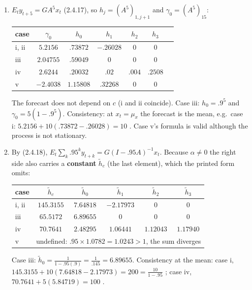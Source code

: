 \documentclass[12pt, letterpaper]{article}
\begin{document}
\begin{tcolorbox}[evenbox,title={Exercise 2.4 \quad AR(4) with a Constant}]
\begin{enumerate}
\item $E_ty_{t+5}=GA^5x_t$ (2.4.17), so $h_j=(A^5)_{1,j+1}$ and $\gamma_0=(A^5)_{15}$:
\begin{center}\small
\begin{tabular}{@{}lcccccc@{}}
\toprule
case & $\gamma_0$ & $h_0$ & $h_1$ & $h_2$ & $h_3$\\
\midrule
i, ii & $5.2156$ & $.73872$ & $-.26028$ & 0 & 0\\
iii & $2.04755$ & $.59049$ & 0 & 0 & 0\\
iv & $2.6244$ & $.20032$ & $.02$ & $.004$ & $.2508$\\
v & $-2.4038$ & $1.15808$ & $.32268$ & 0 & 0\\
\bottomrule
\end{tabular}
\end{center}
The forecast does not depend on $c$ (i and ii coincide). Case iii: $h_0=.9^5$ and
$\gamma_0=5(1-.9^5)$. Consistency: at $x_t=\mu_x$ the forecast is the mean, e.g.\ case i:
$5.2156+10(.73872-.26028)=10$ \checkmark. Case v's formula is valid although the process is not
stationary.

\item By (2.4.18), $E_t\sum_k.95^ky_{t+k}=G(I-.95A)^{-1}x_t$. Because $\alpha\neq0$ the right side
also carries a \textbf{constant} $\tilde h_c$ (the last element), which the printed form omits:
\begin{center}\small
\begin{tabular}{@{}lccccc@{}}
\toprule
case & $\tilde h_c$ & $\tilde h_0$ & $\tilde h_1$ & $\tilde h_2$ & $\tilde h_3$\\
\midrule
i, ii & $145.3155$ & $7.64818$ & $-2.17973$ & 0 & 0\\
iii & $65.5172$ & $6.89655$ & 0 & 0 & 0\\
iv & $70.7641$ & $2.48295$ & $1.06441$ & $1.12043$ & $1.17940$\\
v & \multicolumn{5}{c}{undefined: $.95\times1.0782=1.0243>1$, the sum diverges}\\
\bottomrule
\end{tabular}
\end{center}
Case iii: $\tilde h_0=\frac{1}{1-.95(.9)}=\frac1{.145}=6.89655$. Consistency at the mean: case i,
$145.3155+10(7.64818-2.17973)=200=\frac{10}{1-.95}$ \checkmark; case iv, $70.7641+5(5.84719)=100$ \checkmark.


\end{enumerate}
\end{tcolorbox}
\end{document}
